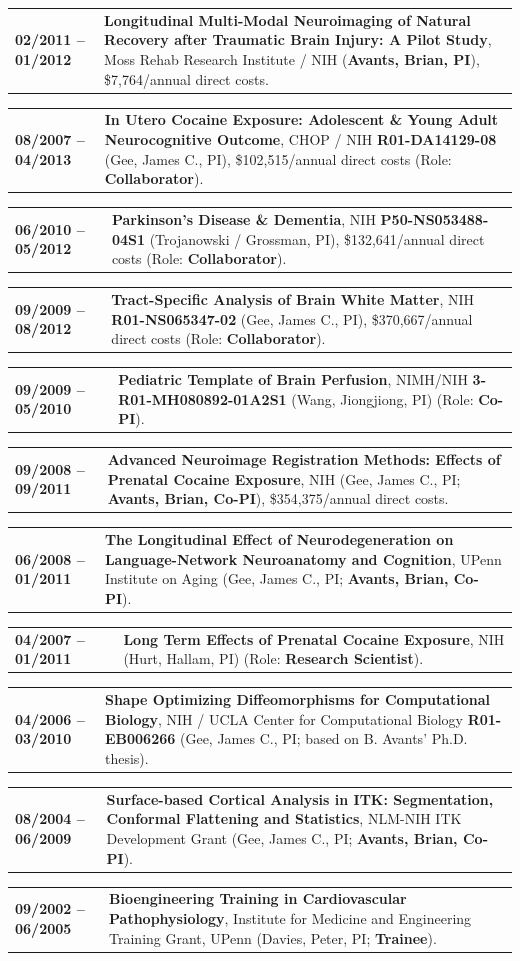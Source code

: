 \documentclass[10pt,letterpaper]{article}
\makeatletter
\newcommand{\cvline}[2]{%
  \noindent\begin{tabularx}{\textwidth}{@{} >{\raggedright\arraybackslash\bfseries\footnotesize\color{accent}}p{1.15in} >{\footnotesize\arraybackslash}X @{}}
    #1 & #2
  \end{tabularx}\par\vspace{2pt}%
}
\makeatother
\begin{document}
\cvline{02/2011 -- 01/2012}{\textbf{Longitudinal Multi-Modal Neuroimaging of Natural Recovery after Traumatic Brain Injury: A Pilot Study}, Moss Rehab Research Institute / NIH (\textbf{Avants, Brian, PI}), \$7,764/annual direct costs.}
\cvline{08/2007 -- 04/2013}{\textbf{In Utero Cocaine Exposure: Adolescent \& Young Adult Neurocognitive Outcome}, CHOP / NIH \textbf{R01-DA14129-08} (Gee, James C., PI), \$102,515/annual direct costs (Role: \textbf{Collaborator}).}
\cvline{06/2010 -- 05/2012}{\textbf{Parkinson's Disease \& Dementia}, NIH \textbf{P50-NS053488-04S1} (Trojanowski / Grossman, PI), \$132,641/annual direct costs (Role: \textbf{Collaborator}).}
\cvline{09/2009 -- 08/2012}{\textbf{Tract-Specific Analysis of Brain White Matter}, NIH \textbf{R01-NS065347-02} (Gee, James C., PI), \$370,667/annual direct costs (Role: \textbf{Collaborator}).}
\cvline{09/2009 -- 05/2010}{\textbf{Pediatric Template of Brain Perfusion}, NIMH/NIH \textbf{3-R01-MH080892-01A2S1} (Wang, Jiongjiong, PI) (Role: \textbf{Co-PI}).}
\cvline{09/2008 -- 09/2011}{\textbf{Advanced Neuroimage Registration Methods: Effects of Prenatal Cocaine Exposure}, NIH (Gee, James C., PI; \textbf{Avants, Brian, Co-PI}), \$354,375/annual direct costs.}
\cvline{06/2008 -- 01/2011}{\textbf{The Longitudinal Effect of Neurodegeneration on Language-Network Neuroanatomy and Cognition}, UPenn Institute on Aging (Gee, James C., PI; \textbf{Avants, Brian, Co-PI}).}
\cvline{04/2007 -- 01/2011}{\textbf{Long Term Effects of Prenatal Cocaine Exposure}, NIH (Hurt, Hallam, PI) (Role: \textbf{Research Scientist}).}
\cvline{04/2006 -- 03/2010}{\textbf{Shape Optimizing Diffeomorphisms for Computational Biology}, NIH / UCLA Center for Computational Biology \textbf{R01-EB006266} (Gee, James C., PI; based on B. Avants' Ph.D. thesis).}
\cvline{08/2004 -- 06/2009}{\textbf{Surface-based Cortical Analysis in ITK: Segmentation, Conformal Flattening and Statistics}, NLM-NIH ITK Development Grant (Gee, James C., PI; \textbf{Avants, Brian, Co-PI}).}
\cvline{09/2002 -- 06/2005}{\textbf{Bioengineering Training in Cardiovascular Pathophysiology}, Institute for Medicine and Engineering Training Grant, UPenn (Davies, Peter, PI; \textbf{Trainee}).}

\end{document}
